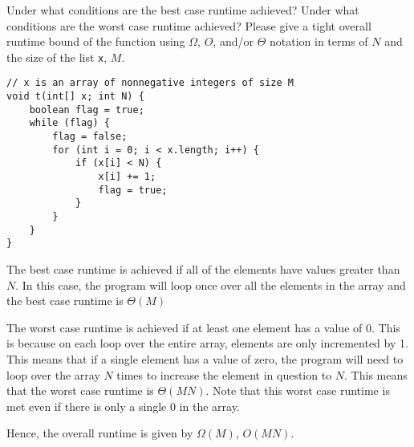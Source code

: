 \question Under what conditions are the best case runtime achieved? Under what conditions are the worst case runtime achieved? Please give a tight overall runtime bound of the function using $\Omega$, $O$, and/or $\Theta$ notation in terms of $N$ and the size of the list \lstinline{x}, $M$.


\begin{lstlisting}
// x is an array of nonnegative integers of size M
void t(int[] x; int N) {
    boolean flag = true;
    while (flag) {
        flag = false;
        for (int i = 0; i < x.length; i++) {
            if (x[i] < N) {
                x[i] += 1;
                flag = true;
            }
        }
    }
}
\end{lstlisting}

\begin{solution}
The best case runtime is achieved if all of the elements have values greater than $N$. In this case, the program will loop once over all the elements in the array and the best case runtime is $\Theta(M)$

The worst case runtime is achieved if at least one element has a value of 0. This is because on each loop over the entire array, elements are only incremented by 1. This means that if a single element has a value of zero, the program will need to loop over the array $N$ times to increase the element in question to $N$. This means that the worst case runtime is $\Theta(MN)$. Note that this worst case runtime is met even if there is only a single 0 in the array.

Hence, the overall runtime is given by $\Omega(M)$, $O(MN)$.

\end{solution}